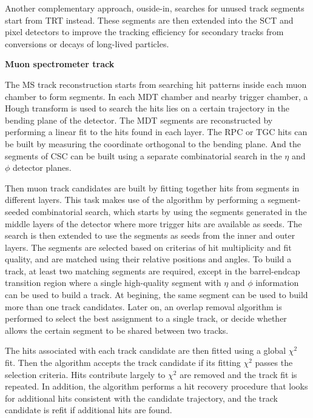 Another complementary approach, ouside-in, searches for unused track segments start from TRT instead.
These segments are then extended into the SCT and pixel detectors to improve the tracking efficiency for secondary tracks from conversions or decays of long-lived particles.

\textbf{Muon spectrometer track}

The MS track reconstruction\cite{Aad:2016jkr} starts from searching hit patterns inside each muon chamber to form segments.
In each MDT chamber and nearby trigger chamber, a Hough transform\cite{ILLINGWORTH198887} is used to search the hits lies on a certain trajectory in the bending plane of the detector.
The MDT segments are reconstructed by performing a linear fit to the hits found in each layer.
The RPC or TGC hits can be built by measuring the coordinate orthogonal to the bending plane.
And the segments of CSC can be built using a separate combinatorial search in the $\eta$ and $\phi$ detector planes.

Then muon track candidates are built by fitting together hits from segments in different layers.
This task makes use of the algorithm by performing a segment-seeded combinatorial search, which starts by using the segments generated in the middle layers of the detector where more trigger hits are available as seeds.
The search is then extended to use the segments as seeds from the inner and outer layers.
The segments are selected based on criterias of hit multiplicity and fit quality, and are matched using their relative positions and angles.
To build a track, at least two matching segments are required, except in the barrel-endcap transition region where a single high-quality segment with $\eta$ and $\phi$ information can be used to build a track.
At begining, the same segment can be used to build more than one track candidates.
Later on, an overlap removal algorithm is performed to select the best assignment to a single track, or decide whether allows the certain segment to be shared between two tracks.

The hits associated with each track candidate are then fitted using a global $\chi^{2}$ fit.
Then the algorithm accepts the track candidate if its fitting $\chi^{2}$ passes the selection criteria.
Hits contribute largely to $\chi^{2}$ are removed and the track fit is repeated.
In addition, the algorithm performs a hit recovery procedure that looks for additional hits consistent with the candidate trajectory, and the track candidate is refit if additional hits are found.
